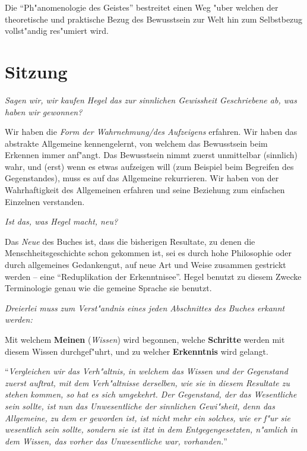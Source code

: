\documentclass[a4paper, emulatestandardclasses]{scrartcl}
\begin{document}
Die "`Ph"anomenologie des Geistes"' bestreitet einen Weg "uber welchen der theoretische und praktische Bezug des Bewusstsein zur Welt hin zum Selbstbezug vollst"andig res"umiert wird.



\section*{Sitzung}

\emph{Sagen wir, wir kaufen Hegel das zur sinnlichen Gewissheit Geschriebene ab, was haben wir gewonnen?}

Wir haben die \emph{Form der Wahrnehmung/des Aufzeigens} erfahren. Wir haben das abstrakte Allgemeine kennengelernt, von welchem das Bewusstsein beim Erkennen immer anf"angt. Das Bewusstsein nimmt zuerst unmittelbar (sinnlich) wahr, und (erst) wenn es etwas aufzeigen will (zum Beispiel beim Begreifen des Gegenstandes), muss es auf das Allgemeine rekurrieren. Wir haben von der Wahrhaftigkeit des Allgemeinen erfahren und seine Beziehung zum einfachen Einzelnen verstanden.\newline

\noindent \emph{Ist das, was Hegel macht, \emph{neu}?}

Das \emph{Neue} des Buches ist, dass die bisherigen Resultate, zu denen die Menschheitsgeschichte schon gekommen ist, sei es durch hohe Philosophie oder durch allgemeines Gedankengut, auf neue Art und Weise zusammen gestrickt werden -- eine "`Reduplikation der Erkenntnisee"'. Hegel benutzt zu diesem Zwecke Terminologie genau wie die gemeine Sprache sie benutzt.\newline

\noindent \emph{Dreierlei muss zum Verst"andnis eines jeden Abschnittes des Buches erkannt werden:} 

Mit welchem \textbf{Meinen} (\emph{Wissen}) wird begonnen, welche \textbf{Schritte} werden mit diesem Wissen durchgef"uhrt, und zu welcher \textbf{Erkenntnis} wird gelangt.\newline

"`\emph{Vergleichen wir das Verh"altnis, in welchem das Wissen und der Gegenstand zuerst auftrat, mit dem Verh"altnisse derselben, wie sie in diesem Resultate zu stehen kommen, so hat es sich umgekehrt. Der Gegenstand, der das Wesentliche sein sollte, ist nun das Unwesentliche der sinnlichen Gewi"sheit, denn das Allgemeine, zu dem er geworden ist, ist nicht mehr ein solches, wie er f"ur sie wesentlich sein sollte, sondern sie ist itzt in dem Entgegengesetzten, n"amlich in dem Wissen, das vorher das Unwesentliche war, vorhanden.}"'\newline
\end{document}
